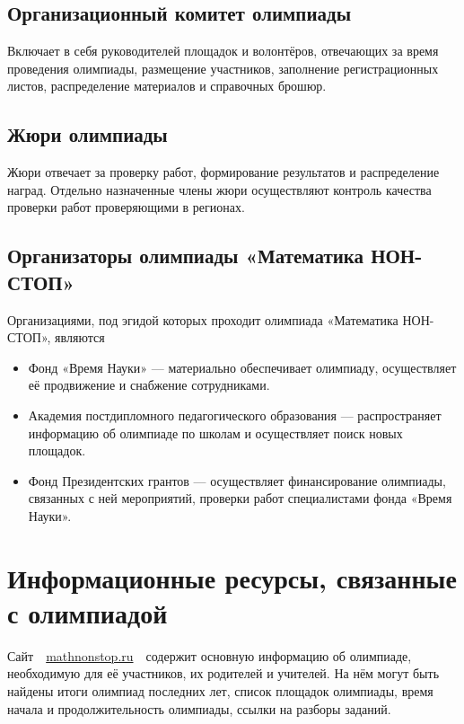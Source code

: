 \documentclass[a4paper,12pt]{article}
\newcommand{\mns}{«Математика НОН-СТОП»\xspace}
\begin{document}
\subsection{Организационный комитет олимпиады}

Включает в себя руководителей площадок и волонтёров, отвечающих за время проведения олимпиады, размещение участников, заполнение регистрационных листов, распределение материалов и справочных брошюр.

\subsection{Жюри олимпиады}

Жюри отвечает за проверку работ, формирование результатов и распределение наград.
Отдельно назначенные члены жюри осуществляют контроль качества проверки работ проверяющими в регионах.

\subsection{Организаторы олимпиады \mns}

Организациями, под эгидой которых проходит олимпиада \mns, являются \vspace{-4mm}

\begin{itemize}
\item Фонд «Время Науки» — материально обеспечивает олимпиаду, осуществляет её продвижение и снабжение сотрудниками.

\item Академия постдипломного педагогического образования — распространяет информацию об олимпиаде по школам и осуществляет поиск новых площадок.

\item Фонд Президентских грантов — осуществляет финансирование олимпиады, связанных с ней мероприятий, проверки работ специалистами фонда «Время Науки».
\end{itemize}

\section{Информационные ресурсы, связанные с олимпиадой}

Сайт\ \ \url{mathnonstop.ru}\ \ содержит основную информацию об олимпиаде, необходимую для её участников, их родителей и учителей. На нём могут быть найдены итоги олимпиад последних лет, список площадок олимпиады, время начала и продолжительность олимпиады, ссылки на разборы заданий.
\end{document}
